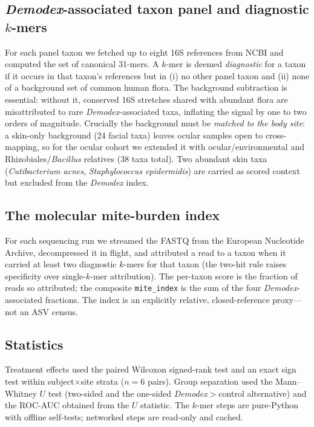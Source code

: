 \documentclass[11pt]{article}
\newcommand{\demodex}{\textit{Demodex}}
\begin{document}
\subsection{\demodex-associated taxon panel and diagnostic $k$-mers}
For each panel taxon we fetched up to eight 16S references from NCBI and computed
the set of canonical 31-mers. A $k$-mer is deemed \emph{diagnostic} for a taxon
if it occurs in that taxon's references but in (i) no other panel taxon and
(ii) none of a background set of common human flora. The background subtraction
is essential: without it, conserved 16S stretches shared with abundant flora are
misattributed to rare \demodex-associated taxa, inflating the signal by one to
two orders of magnitude. Crucially the background must be \emph{matched to the
body site}: a skin-only background (24 facial taxa) leaves ocular samples open to
cross-mapping, so for the ocular cohort we extended it with ocular/environmental
and Rhizobiales/\textit{Bacillus} relatives (38 taxa total). Two abundant skin taxa
(\textit{Cutibacterium acnes}, \textit{Staphylococcus epidermidis}) are carried
as scored context but excluded from the \demodex{} index.

\subsection{The molecular mite-burden index}
For each sequencing run we streamed the FASTQ from the European Nucleotide
Archive, decompressed it in flight, and attributed a read to a taxon when it
carried at least two diagnostic $k$-mers for that taxon (the two-hit rule raises
specificity over single-$k$-mer attribution). The per-taxon score is the
fraction of reads so attributed; the composite \texttt{mite\_index} is the sum of
the four \demodex-associated fractions. The index is an explicitly relative,
closed-reference proxy---not an ASV census.

\subsection{Statistics}
Treatment effects used the paired Wilcoxon signed-rank test and an exact sign
test within subject$\times$site strata ($n=6$ pairs). Group separation used the
Mann--Whitney $U$ test (two-sided and the one-sided \demodex{}$>$control
alternative) and the ROC-AUC obtained from the $U$ statistic. The $k$-mer steps are
pure-Python with offline self-tests; networked steps are read-only and cached.
\end{document}
